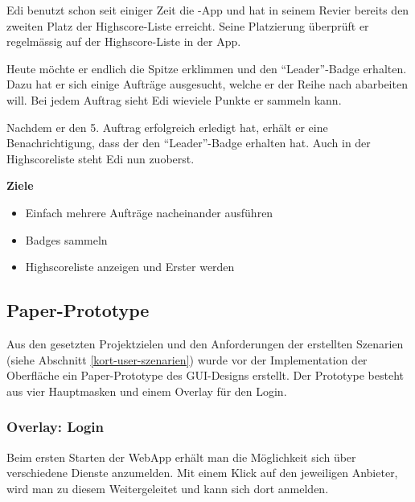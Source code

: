 Edi benutzt schon seit einiger Zeit die \kort{}-App und hat in seinem Revier bereits den zweiten Platz der Highscore-Liste erreicht.
Seine Platzierung überprüft er regelmässig auf der Highscore-Liste in der App.

Heute möchte er endlich die Spitze erklimmen und den "`Leader"'-Badge erhalten.
Dazu hat er sich einige Aufträge ausgesucht, welche er der Reihe nach abarbeiten will.
Bei jedem Auftrag sieht Edi wieviele Punkte er sammeln kann.

Nachdem er den 5. Auftrag erfolgreich erledigt hat, erhält er eine Benachrichtigung, dass der den "`Leader"'-Badge erhalten hat.
Auch in der Highscoreliste steht Edi nun zuoberst.

\textbf{Ziele}
\begin{itemize}
\item Einfach mehrere Aufträge nacheinander ausführen
\item Badges sammeln
\item Highscoreliste anzeigen und Erster werden
\end{itemize}

\subsection{Paper-Prototype}
\setcounter{subfigure}{0}

Aus den gesetzten Projektzielen und den Anforderungen der erstellten Szenarien (siehe Abschnitt \ref{kort-user-szenarien}) wurde vor der Implementation der Oberfläche ein Paper-Prototype des GUI-Designs erstellt.
Der Prototype besteht aus vier Hauptmasken und einem Overlay für den Login.

\subsubsection{Overlay: Login}
Beim ersten Starten der \gls{WebApp} erhält man die Möglichkeit sich über verschiedene Dienste anzumelden.
Mit einem Klick auf den jeweiligen Anbieter, wird man zu diesem Weitergeleitet und kann sich dort anmelden.

